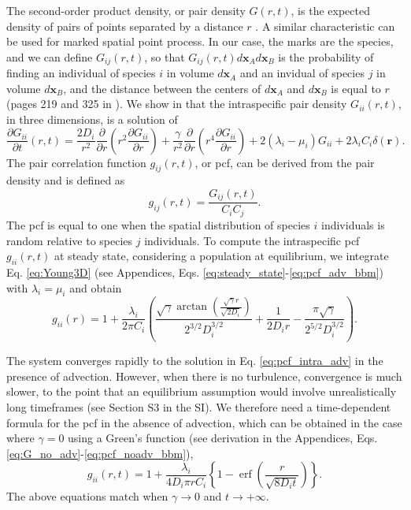 \documentclass[english]{article}
\DeclareMathOperator\erf{erf}
\begin{document}
The second-order product density, or pair density $G(r,t)$, is the
expected density of pairs of points separated by a distance $r$ \citep{law_population_2003}.
A similar characteristic can be used for marked spatial point process.
In our case, the marks are the species, and we can define $G_{ij}(r,t)$,
so that $G_{ij}(r,t)d\mathbf{x}_{A}d\mathbf{x}_{B}$ is the probability
of finding an individual of species $i$ in volume $d\mathbf{x}_{A}$
and an invidual of species $j$ in volume $d\mathbf{x}_{B}$, and
the distance between the centers of $d\mathbf{x}_{A}$ and $d\mathbf{x}_{B}$
is equal to $r$ (pages 219 and 325 in \citealp{illian2008statistical}).
We show in \citet{picoche_rescience_2022} that the intraspecific
pair density $G_{ii}(r,t)$, in three dimensions, is a solution of
\begin{equation}
\frac{\partial G_{ii}}{\partial t}(r,t)=\frac{2D_{i}}{r^{2}}\frac{\partial}{\partial r}\left(r^{2}\frac{\partial G_{ii}}{\partial r}\right)+\frac{\gamma}{r^{2}}\frac{\partial}{\partial r}\left(r^{4}\frac{\partial G_{ii}}{\partial r}\right)+2(\lambda_{i}-\mu_{i})G_{ii}+2\lambda_i C_{i}\delta(\boldsymbol{r}).\label{eq:Young3D}
\end{equation}
The pair correlation function $g_{ij}(r,t)$, or pcf, can be derived
from the pair density and is defined as
\begin{equation}
g_{ij}(r,t)=\frac{G_{ij}(r,t)}{C_{i}C_{j}}.\label{eq:def_pcf}
\end{equation}
The pcf is equal to one when the spatial distribution of species $i$
individuals is random relative to species $j$ individuals. To compute
the intraspecific pcf $g_{ii}(r,t)$ at steady state, considering
a population at equilibrium, we integrate Eq. \ref{eq:Young3D} (see
Appendices, Eqs. \ref{eq:steady_state}-\ref{eq:pcf_adv_bbm}) with
$\lambda_{i}=\mu_{i}$ and obtain
\begin{equation}
g_{ii}(r)=1+\frac{\lambda_i}{2\pi C_{i}}\left(\frac{\sqrt{\gamma}\arctan\left(\frac{\sqrt{\gamma}r}{\sqrt{2D_i}}\right)}{2^{3/2}D_i^{3/2}}+\frac{1}{2D_ir}-\frac{\pi\sqrt{\gamma}}{2^{5/2}D_i^{3/2}}\right).\label{eq:pcf_intra_adv}
\end{equation}

The system converges rapidly to the solution in Eq. \ref{eq:pcf_intra_adv}
in the presence of advection. However, when there is no turbulence,
convergence is much slower, to the point that an equilibrium assumption
would involve unrealistically long timeframes (see Section S3 in the
SI). We therefore need a time-dependent formula for the pcf in the
absence of advection, which can be obtained in the case where $\gamma=0$
using a Green's function (see derivation in the Appendices, Eqs. \ref{eq:G_no_adv}-\ref{eq:pcf_noadv_bbm}),
\begin{equation}
g_{ii}(r,t)=1+\frac{\lambda_i}{4D_i\pi rC_{i}}\left\{ 1-\erf\left(\frac{r}{\sqrt{8D_it}}\right)\right\}.\label{eq:pcf_intra_noadv}
\end{equation}
The above equations match when $\gamma\rightarrow0$ and $t\rightarrow+\infty$.
\end{document}
